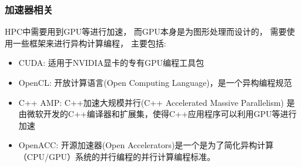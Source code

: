 \subsubsection{加速器相关}
HPC中需要用到GPU等进行加速，
而GPU本身是为图形处理而设计的，
需要使用一些框架来进行异构计算编程，
主要包括:

\begin{itemize}
    \item CUDA: 适用于NVIDIA显卡的专有GPU编程工具包
    \item OpenCL: 开放计算语言(Open Computing Language)，是一个异构编程规范
    \item C++ AMP: C++加速大规模并行(C++ Accelerated Massive Parallelism)
    是由微软开发的C++编译器和扩展集，使得C++应用程序可以利用GPU等进行加速\cite{c++_amp}
    \item OpenACC: 开源加速器(Open Accelerators)是一个是为了简化异构计算（CPU/GPU）系统的并行编程的并行计算编程标准。
\end{itemize}